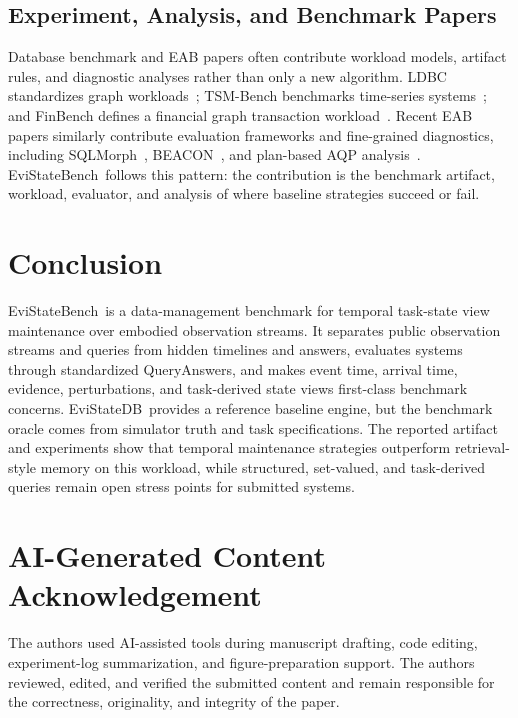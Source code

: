 \documentclass[conference]{IEEEtran}
\newcommand{\bench}{EviStateBench}
\newcommand{\engine}{EviStateDB}
\begin{document}
\subsection{Experiment, Analysis, and Benchmark Papers}

Database benchmark and EAB papers often contribute workload models, artifact rules, and diagnostic analyses rather than only a new algorithm. LDBC standardizes graph workloads~\cite{erling2015ldbc,iosup2016ldbc}; TSM-Bench benchmarks time-series systems~\cite{khelifati2023tsmbench}; and FinBench defines a financial graph transaction workload~\cite{qi2025finbench}. Recent EAB papers similarly contribute evaluation frameworks and fine-grained diagnostics, including SQLMorph~\cite{malekpour2026sqlmorph}, BEACON~\cite{najafi2025beacon}, and plan-based AQP analysis~\cite{mu2025aqp}. \bench\ follows this pattern: the contribution is the benchmark artifact, workload, evaluator, and analysis of where baseline strategies succeed or fail.

\section{Conclusion}

\bench\ is a data-management benchmark for temporal task-state view maintenance over embodied observation streams. It separates public observation streams and queries from hidden timelines and answers, evaluates systems through standardized QueryAnswers, and makes event time, arrival time, evidence, perturbations, and task-derived state views first-class benchmark concerns. \engine\ provides a reference baseline engine, but the benchmark oracle comes from simulator truth and task specifications. The reported artifact and experiments show that temporal maintenance strategies outperform retrieval-style memory on this workload, while structured, set-valued, and task-derived queries remain open stress points for submitted systems.

\section*{AI-Generated Content Acknowledgement}

The authors used AI-assisted tools during manuscript drafting, code editing, experiment-log summarization, and figure-preparation support. The authors reviewed, edited, and verified the submitted content and remain responsible for the correctness, originality, and integrity of the paper.



\end{document}
